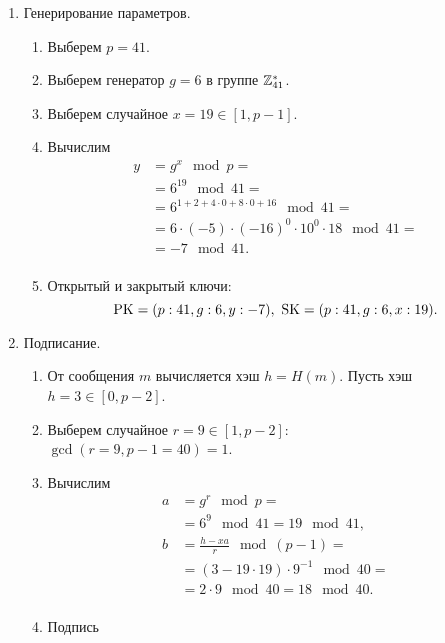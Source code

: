 \begin{enumerate}
    \item Генерирование параметров.
        \begin{enumerate}
            \item Выберем $p=41$.
            \item Выберем генератор $g=6$ в группе $\mathbb{Z}_{41}^*$.
            \item Выберем случайное $x = 19 \in [1, p-1]$.%
            \item Вычислим
                \[ \begin{array}{ll}
                    y & = g^x \mod p = \\
                    & = 6^{19} \mod 41 = \\
                    & = 6^{1 + 2 + 4 \cdot 0 + 8 \cdot 0 + 16} \mod 41 = \\
                    & = 6 \cdot (-5) \cdot (-16)^0 \cdot 10^0 \cdot 18 \mod 41 = \\
                    & = -7 \mod 41. \\
                \end{array} \]
            \item Открытый и закрытый ключи:
                \[ \textrm{PK} = (p:41, g:6, y:-7), ~ \textrm{SK} = (p:41, g:6, x:19). \]
        \end{enumerate}
    \item Подписание.
        \begin{enumerate}
            \item От сообщения $m$ вычисляется хэш $h = H(m)$. Пусть хэш $h  = 3 \in [0, p-2]$.
            \item Выберем случайное $r = 9 \in [1, p-2]$: \\
                $\gcd(r=9, p-1 = 40) = 1$.
            \item Вычислим
                \[ \begin{array}{ll}
                    a & = g^r \mod p = \\
                      & = 6^9 \mod 41 = 19 \mod 41, \\
                    b & = \frac{h - xa}{r} \mod (p-1) = \\
                      & = (3 - 19 \cdot 19) \cdot 9^{-1} \mod 40 = \\
                      & = 2 \cdot 9 \mod 40 = 18 \mod 40. \\
                \end{array} \]
            \item Подпись

\end{enumerate}
\end{enumerate}
